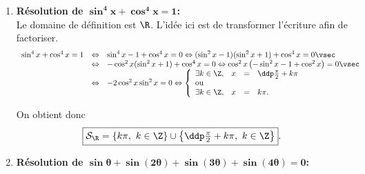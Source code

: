 \begin{correction}  \;
\begin{enumerate}
 \item \textbf{R\'esolution de $\mathbf{ \sin^4{x}+\cos^4{x}=1 }$:}\\
\noindent 
Le domaine de d\'efinition est $\R$. L'id\'ee ici est de transformer l'\'ecriture afin de factoriser. 
$$\begin{array}{lll}
\sin^4{x}+\cos^4{x}=1 &\Leftrightarrow & \sin^4{x}-1+\cos^4{x}=0
\Leftrightarrow  (\sin^2{x}-1)(\sin^2{x}+1)+\cos^4{x}=0\vsec\\
&\Leftrightarrow & -\cos^2{x}(\sin^2{x}+1)+\cos^4{x}=0
\Leftrightarrow 
\cos^2{x}\left(-\sin^2{x}-1+\cos^2{x} \right)=0\vsec\\
&\Leftrightarrow &  -2\cos^2{x}\sin^2{x}=0
\Leftrightarrow \left\lbrace
\begin{array}{llll}
\exists k\in\Z,& x&=&\ddp\frac{\pi}{2}+k\pi\\
\hbox{ou}\\
\exists k\in\Z,& x&=&k\pi.\\
\end{array}\right.\end{array}$$
\begin{minipage}[c]{0.45\textwidth}
 On obtient donc
$$\fbox{$\mathcal{S}_{\R}=\left\lbrace k\pi,\ k\in\Z \right\rbrace\cup\left\lbrace \ddp\frac{\pi}{2}+k\pi,\ k\in\Z \right\rbrace$}.$$
\end{minipage}
\quad \begin{minipage}[c]{0.45\textwidth}
\begin{center}
\end{center}
\end{minipage}
\item \textbf{R\'esolution de $\mathbf{ \sin{\theta}+\sin{(2\theta)}+\sin{(3\theta)}+\sin{(4\theta)}=0  }$:}\\

\end{enumerate}
\end{correction}
